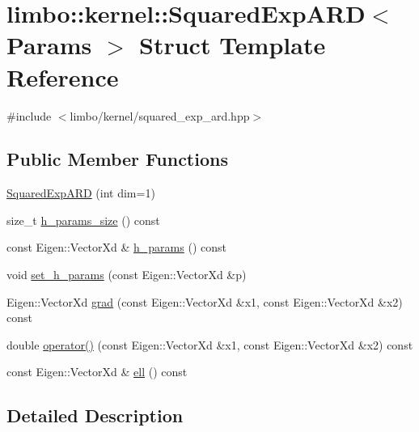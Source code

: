 \hypertarget{structlimbo_1_1kernel_1_1_squared_exp_a_r_d}{}\section{limbo\+:\+:kernel\+:\+:Squared\+Exp\+A\+R\+D$<$ Params $>$ Struct Template Reference}
\label{structlimbo_1_1kernel_1_1_squared_exp_a_r_d}


{\ttfamily \#include $<$limbo/kernel/squared\+\_\+exp\+\_\+ard.\+hpp$>$}

\subsection*{Public Member Functions}
\begin{DoxyCompactItemize}
\item 
\hyperlink{structlimbo_1_1kernel_1_1_squared_exp_a_r_d_a33d5c074a487792a305a0ae89e864f34}{Squared\+Exp\+A\+R\+D} (int dim=1)
\item 
size\+\_\+t \hyperlink{structlimbo_1_1kernel_1_1_squared_exp_a_r_d_a42d0d653ef61abce8713acdec5c876a5}{h\+\_\+params\+\_\+size} () const 
\item 
const Eigen\+::\+Vector\+Xd \& \hyperlink{structlimbo_1_1kernel_1_1_squared_exp_a_r_d_a528af96c67834d1ee6bfb8594fcc2956}{h\+\_\+params} () const 
\item 
void \hyperlink{structlimbo_1_1kernel_1_1_squared_exp_a_r_d_a0275e61c4ce395b988c903302d8e088e}{set\+\_\+h\+\_\+params} (const Eigen\+::\+Vector\+Xd \&p)
\item 
Eigen\+::\+Vector\+Xd \hyperlink{structlimbo_1_1kernel_1_1_squared_exp_a_r_d_aa7dd2fbe6e8d5e84101eb3ccce15359e}{grad} (const Eigen\+::\+Vector\+Xd \&x1, const Eigen\+::\+Vector\+Xd \&x2) const 
\item 
double \hyperlink{structlimbo_1_1kernel_1_1_squared_exp_a_r_d_ab3021822831528a6dbb4fcaf0d1c157e}{operator()} (const Eigen\+::\+Vector\+Xd \&x1, const Eigen\+::\+Vector\+Xd \&x2) const 
\item 
const Eigen\+::\+Vector\+Xd \& \hyperlink{structlimbo_1_1kernel_1_1_squared_exp_a_r_d_aad6902b522c4fdd9b5c5799a0c440c40}{ell} () const 
\end{DoxyCompactItemize}


\subsection{Detailed Description}
